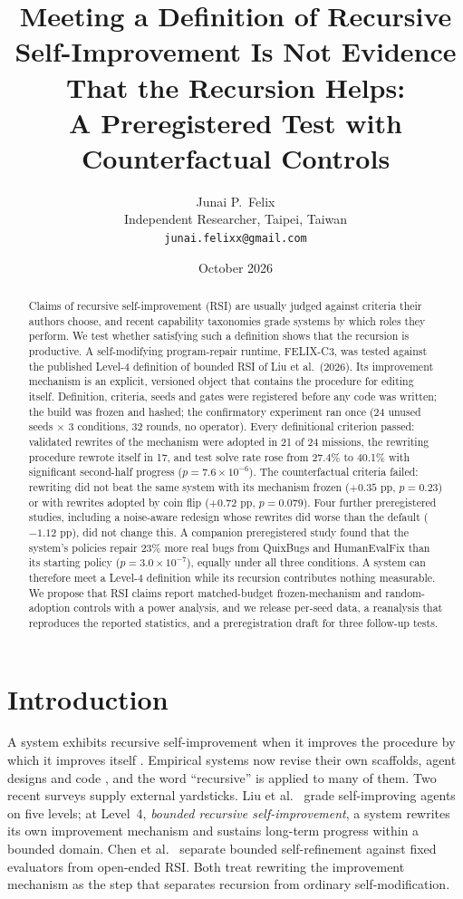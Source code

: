 \documentclass[11pt]{article}
\title{Meeting a Definition of Recursive Self-Improvement Is Not Evidence That the Recursion Helps:\\[2pt]
\large A Preregistered Test with Counterfactual Controls}
\author{Junai P.\ Felix\\
\small Independent Researcher, Taipei, Taiwan\\
\small \texttt{junai.felixx@gmail.com}}
\date{October 2026}
\begin{document}
\maketitle

\begin{abstract}
Claims of recursive self-improvement (RSI) are usually judged against criteria their authors choose, and recent capability taxonomies grade systems by which roles they perform. We test whether satisfying such a definition shows that the recursion is productive. A self-modifying program-repair runtime, FELIX-C3, was tested against the published Level-4 definition of bounded RSI of Liu et al.\ (2026). Its improvement mechanism is an explicit, versioned object that contains the procedure for editing itself. Definition, criteria, seeds and gates were registered before any code was written; the build was frozen and hashed; the confirmatory experiment ran once (24 unused seeds $\times$ 3 conditions, 32 rounds, no operator). Every definitional criterion passed: validated rewrites of the mechanism were adopted in 21 of 24 missions, the rewriting procedure rewrote itself in 17, and test solve rate rose from 27.4\% to 40.1\% with significant second-half progress ($p = 7.6\times10^{-6}$). The counterfactual criteria failed: rewriting did not beat the same system with its mechanism frozen ($+0.35$ pp, $p = 0.23$) or with rewrites adopted by coin flip ($+0.72$ pp, $p = 0.079$). Four further preregistered studies, including a noise-aware redesign whose rewrites did worse than the default ($-1.12$ pp), did not change this. A companion preregistered study found that the system's policies repair 23\% more real bugs from QuixBugs and HumanEvalFix than its starting policy ($p = 3.0\times10^{-7}$), equally under all three conditions. A system can therefore meet a Level-4 definition while its recursion contributes nothing measurable. We propose that RSI claims report matched-budget frozen-mechanism and random-adoption controls with a power analysis, and we release per-seed data, a reanalysis that reproduces the reported statistics, and a preregistration draft for three follow-up tests.
\end{abstract}

\section{Introduction}

A system exhibits recursive self-improvement when it improves the procedure by which it improves itself \cite{good1966,schmidhuber2003}. Empirical systems now revise their own scaffolds, agent designs and code \cite{zelikman2024stop,yin2025godel,hu2025adas,zhang2026dgm,robeyns2025sica,wang2026hgm}, and the word ``recursive'' is applied to many of them. Two recent surveys supply external yardsticks. Liu et al.\ \cite{liu2026path} grade self-improving agents on five levels; at Level~4, \emph{bounded recursive self-improvement}, a system rewrites its own improvement mechanism and sustains long-term progress within a bounded domain. Chen et al.\ \cite{chen2026rsi} separate bounded self-refinement against fixed evaluators from open-ended RSI. Both treat rewriting the improvement mechanism as the step that separates recursion from ordinary self-modification.
\end{document}
